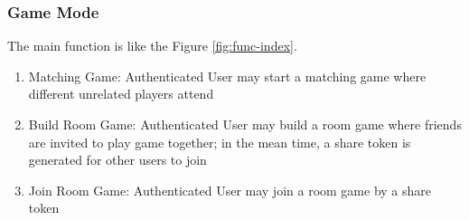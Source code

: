 \documentclass[11pt]{article}
\begin{document}
\subsubsection{Game Mode}
The main function is like the Figure \ref{fig:func-index}.

\begin{enumerate}
\item
Matching Game: Authenticated User may start a matching game where different unrelated players attend
\item
Build Room Game: Authenticated User may build a room game where friends are invited to play game together; in the mean time, a share token is generated for other users to join
\item
Join Room Game: Authenticated User may join a room game by a share token
\end{enumerate}
\end{document}

